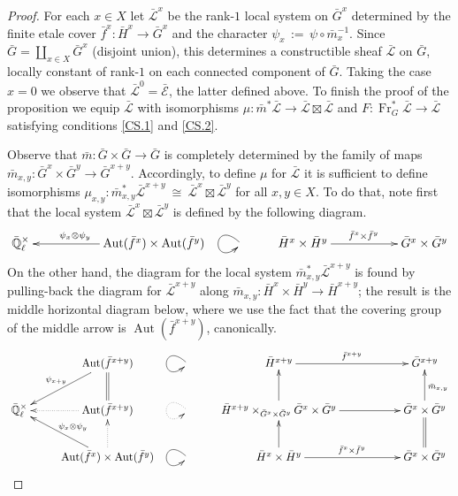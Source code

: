 \documentclass[11pt]{amsart}
\theoremstyle{plain}
\theoremstyle{definition}
\theoremstyle{remark}
\newcommand{\EE}{\mathbb{\bar Q}_\ell}
\newcommand{\Frob}{{\operatorname{Fr}}}
\DeclareMathOperator{\Aut}{Aut}
\newcommand{\ceq}{{\, :=\, }}
\newcommand{\iso}{{\ \cong\ }}
\newcommand{\gcs}[1]{{\mathcal{\bar #1}}}
\begin{document}
\begin{proof}
For each $x\in X$ let $\gcs{L}^x$ be the rank-$1$ local system on ${\bar G}^x$ determined by the finite etale cover ${\bar f}^x : {\bar H}^x \to {\bar G}^x$ and the character $\psi_x \ceq \psi \circ {\bar m}_x^{-1}$.  Since ${\bar G} = \coprod_{x\in X} {\bar G}^x$ (disjoint union), this determines a constructible sheaf $\gcs{L}$ on ${\bar G}$, locally constant of rank-$1$ on each connected component of ${\bar G}$. Taking the case $x=0$ we observe that $\gcs{L}^0 =\gcs{E}$, the latter defined above. To finish the proof of the proposition we equip $\gcs{L}$ with isomorphisms $\mu : {\bar m}^* \gcs{L} \to \gcs{L} \boxtimes\gcs{L}$ and $F : \Frob_{G}^* \gcs{L} \to \gcs{L}$ satisfying conditions \ref{CS.1} and \ref{CS.2}.

Observe that ${\bar m}: {\bar G}\times {\bar G}\to {\bar G}$ is completely determined by the family of maps ${\bar m}_{x,y} : {\bar G}^x \times {\bar G}^{y} \to {\bar G}^{x+y}$. Accordingly, to define $\mu$ for $\gcs{L}$ it is sufficient to define isomorphisms $\mu_{x,y} : {\bar m}_{x,y}^*\gcs{L}^{x+y} \iso \gcs{L}^{x}\boxtimes \gcs{L}^{y}$ for all $x,y\in X$. To do that, note first that the local system $\gcs{L}^{x}\boxtimes \gcs{L}^{y}$ is defined by the following diagram.
\[
\xymatrix{
\EE^\times && \ar[ll]_{\hskip-20pt \psi_x\otimes \psi_y} \Aut({\bar f}^x)\times \Aut({\bar f}^y)  
& \ar@(ul,dl) & {\bar H}^x\times {\bar H}^y \ar[rr]^{{\bar f}^x\times {\bar f}^y} && {\bar G}^x\times {\bar G}^y\\ 
}
\]
On the other hand, the diagram for the local system ${\bar m}_{x,y}^* \gcs{L}^{x+y}$ is found by pulling-back the diagram for $\gcs{L}^{x+y}$ along ${\bar m}_{x,y} : {\bar H}^x\times{\bar H}^y \to {\bar H}^{x+y}$; the result is the middle horizontal diagram below, where we use the fact that the covering group of the middle arrow is $\Aut({\bar f}^{x+y})$, canonically.
\[
\xymatrix{ 
& \ar[dl]_{\psi_{x+y}} \Aut({\bar f}^{x+y})  
& \ar@(ul,dl) & {\bar H}^{x+y} \ar[rr]^{{\bar f}^{x+y}} && {\bar G}^{x+y}\\ 
\EE^\times & \ar@{.>}[l] \Aut({\bar f}^{x+y})  \ar@{=}[u] &  \ar@{.>}@(ul,dl) & \ar[u] {\bar H}^{x+y} \times_{{\bar G}^x\times{\bar G}^y} {\bar G}^x\times{\bar G}^y \ar[rr] && \ar[u]_{{\bar m}_{x,y}} {\bar G}^x\times {\bar G}^y\\
& \ar[lu]_{\psi_x\otimes \psi_y} \ar@{.>}[u] \Aut({\bar f}^x)\times \Aut({\bar f}^y)  
& \ar@(ul,dl) & \ar[u] {\bar H}^x\times {\bar H}^y \ar[rr]^{{\bar f}^x\times {\bar f}^y} && \ar@{=}[u] {\bar G}^x\times {\bar G}^y\\ 
}\]
\end{proof}
\end{document}
